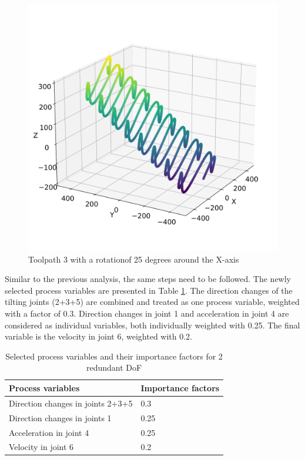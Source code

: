 \begin{figure}[H]
\begin{minipage}{0.5\textwidth}
		\includegraphics[width=\textwidth]{figures/path3_kipp_25_comparison.png}
		\caption{Toolpath 3 with a rotation\newline of 25 degrees around the X-axis}
		\label{TP3_25}
	\end{minipage}\par
\end{figure}
 

Similar to the previous analysis, the same steps need to be followed. The newly selected process variables are presented in Table \ref{PP_2}. The direction changes of the tilting joints (2+3+5) are combined and treated as one process variable, weighted with a factor of 0.3. Direction changes in joint 1 and acceleration in joint 4 are considered as individual variables, both individually weighted with 0.25. The final variable is the velocity in joint 6, weighted with 0.2.

\begin{table}[H]
	\centering
	\begin{tabular}{||l|l||}
		Process variables & Importance factors \\
		\hline
		\hline
		\hline
		Direction changes in joints 2+3+5	&		0.3 \\
		Direction changes in joints 1	& 	0.25 \\
		Acceleration in joint 4	& 		0.25\\
		Velocity in joint 6	& 		0.2\\
		\hline
		\hline
	\end{tabular}
	
	\caption{Selected process variables and their importance factors for 2 redundant DoF}
	\label{PP_2}
\end{table}


